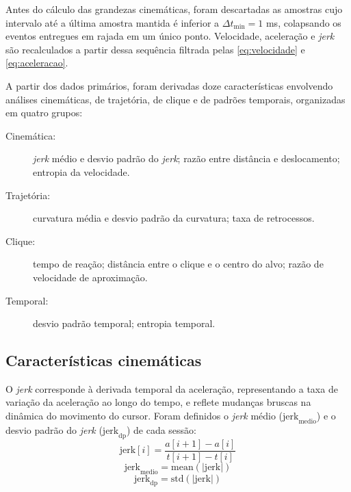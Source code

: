 Antes do cálculo das grandezas cinemáticas, foram descartadas as amostras cujo intervalo até a última amostra mantida é inferior a $\Delta t_{\min} = 1$ ms, colapsando os eventos entregues em rajada em um único ponto. Velocidade, aceleração e \textit{jerk} são recalculados a partir dessa sequência filtrada pelas \autoref{eq:velocidade} e \autoref{eq:aceleracao}.

A partir dos dados primários, foram derivadas doze características envolvendo análises cinemáticas, de trajetória, de clique e de padrões temporais, organizadas em quatro grupos:

\begin{description}
    \item[Cinemática:] \textit{jerk} médio e desvio padrão do \textit{jerk}; razão entre distância e deslocamento; entropia da velocidade.
    \item[Trajetória:] curvatura média e desvio padrão da curvatura; taxa de retrocessos.
    \item[Clique:] tempo de reação; distância entre o clique e o centro do alvo; razão de velocidade de aproximação.
    \item[Temporal:] desvio padrão temporal; entropia temporal.
\end{description}

\subsection{Características cinemáticas}

O \textit{jerk} corresponde à derivada temporal da aceleração, representando a taxa de variação da aceleração ao longo do tempo, e reflete mudanças bruscas na dinâmica do movimento do cursor. Foram definidos o \textit{jerk} médio ($\text{jerk}_{\text{medio}}$) e o desvio padrão do \textit{jerk} ($\text{jerk}_{\text{dp}}$) de cada sessão:
\begin{equation}
    \text{jerk}[i] = \frac{a[i+1] - a[i]}{t[i+1] - t[i]}
    \label{eq:jerk}
\end{equation}
\begin{equation}
    \text{jerk}_{\text{medio}} = \text{mean}\left(|\text{jerk}|\right)
    \label{eq:jerk_medio}
\end{equation}
\begin{equation}
    \text{jerk}_{\text{dp}} = \text{std}\left(|\text{jerk}|\right)
    \label{eq:jerk_dp}
\end{equation}


